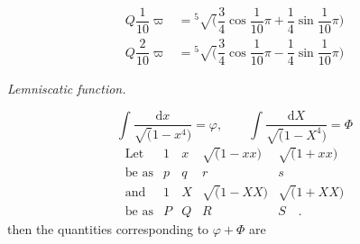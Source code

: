 \[
\begin{aligned}
Q\dfrac1{10}\varpi
&={}^{5}\!\surd(\dfrac34\cos\dfrac1{10}\pi+\dfrac14\sin\dfrac1{10}\pi)\\[5pt]
Q\dfrac2{10}\varpi
&={}^{5}\!\surd(\dfrac34\cos\dfrac1{10}\pi-\dfrac14\sin\dfrac1{10}\pi)
\end{aligned}
\]
\begin{center}\textit{Lemniscatic function.}\end{center}
\[
\int\dfrac{\mathrm{d}x}{\surd(1-x^4)}=\varphi,
\qquad
\int\dfrac{\mathrm{d}X}{\surd(1-X^4)}=\Phi
\]
\[
\begin{array}{rcccc}
\text{Let}&1&x&\surd(1-xx)&\surd(1+xx)\\[5pt]
\text{be as}&p&q&r&s\\[7pt]
\text{and}&1&X&\surd(1-XX)&\surd(1+XX)\\[5pt]
\text{be as}&P&Q&R&S\quad.
\end{array}
\]
\noindent then the quantities corresponding to $\varphi+\Phi$ are



